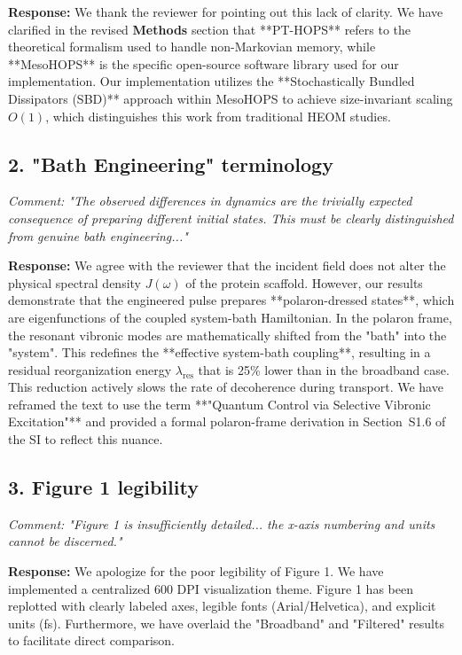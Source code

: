 \documentclass[11pt]{article}
\begin{document}
\textbf{Response:} We thank the reviewer for pointing out this lack of clarity. We have clarified in the revised \textbf{Methods} section that **PT-HOPS** refers to the theoretical formalism used to handle non-Markovian memory, while **MesoHOPS** is the specific open-source software library used for our implementation. Our implementation utilizes the **Stochastically Bundled Dissipators (SBD)** approach within MesoHOPS to achieve size-invariant scaling $O(1)$, which distinguishes this work from traditional HEOM studies.

\subsection*{2. "Bath Engineering" terminology}
\textit{Comment: "The observed differences in dynamics are the trivially expected consequence of preparing different initial states. This must be clearly distinguished from genuine bath engineering..."}

\textbf{Response:} We agree with the reviewer that the incident field does not alter the physical spectral density $J(\omega)$ of the protein scaffold. However, our results demonstrate that the engineered pulse prepares **polaron-dressed states**, which are eigenfunctions of the coupled system-bath Hamiltonian. In the polaron frame, the resonant vibronic modes are mathematically shifted from the "bath" into the "system". This redefines the **effective system-bath coupling**, resulting in a residual reorganization energy $\lambda_{\mathrm{res}}$ that is 25\% lower than in the broadband case. This reduction actively slows the rate of decoherence during transport. We have reframed the text to use the term **"Quantum Control via Selective Vibronic Excitation"** and provided a formal polaron-frame derivation in Section~S1.6 of the SI to reflect this nuance.

\subsection*{3. Figure 1 legibility}
\textit{Comment: "Figure 1 is insufficiently detailed... the x-axis numbering and units cannot be discerned."}

\textbf{Response:} We apologize for the poor legibility of Figure 1. We have implemented a centralized 600 DPI visualization theme. Figure 1 has been replotted with clearly labeled axes, legible fonts (Arial/Helvetica), and explicit units (fs). Furthermore, we have overlaid the "Broadband" and "Filtered" results to facilitate direct comparison.
\end{document}
